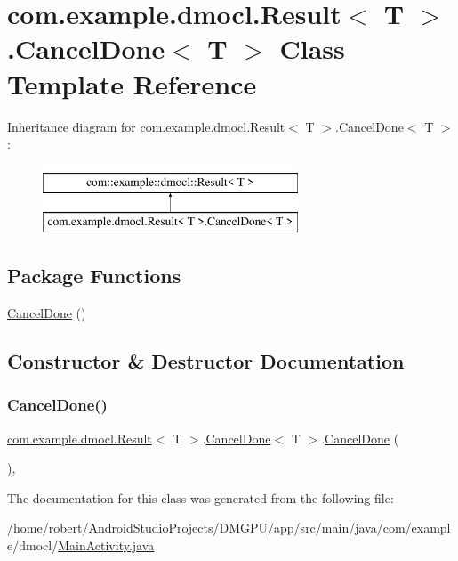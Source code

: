 \hypertarget{classcom_1_1example_1_1dmocl_1_1Result_1_1CancelDone}{}\section{com.\+example.\+dmocl.\+Result$<$ T $>$.Cancel\+Done$<$ T $>$ Class Template Reference}
\label{classcom_1_1example_1_1dmocl_1_1Result_1_1CancelDone}
Inheritance diagram for com.\+example.\+dmocl.\+Result$<$ T $>$.Cancel\+Done$<$ T $>$\+:\begin{figure}[H]
\begin{center}
\leavevmode
\includegraphics[height=2.000000cm]{classcom_1_1example_1_1dmocl_1_1Result_1_1CancelDone}
\end{center}
\end{figure}
\subsection*{Package Functions}
\begin{DoxyCompactItemize}
\item 
\mbox{\hyperlink{classcom_1_1example_1_1dmocl_1_1Result_1_1CancelDone_a11314afeb254ce8d50900ba88538f988}{Cancel\+Done}} ()
\end{DoxyCompactItemize}


\subsection{Constructor \& Destructor Documentation}
\mbox{\label{classcom_1_1example_1_1dmocl_1_1Result_1_1CancelDone_a11314afeb254ce8d50900ba88538f988}} 
\subsubsection{\texorpdfstring{Cancel\+Done()}{CancelDone()}}
{\footnotesize\ttfamily \mbox{\hyperlink{classcom_1_1example_1_1dmocl_1_1Result}{com.\+example.\+dmocl.\+Result}}$<$ T $>$.\mbox{\hyperlink{classcom_1_1example_1_1dmocl_1_1Result_1_1CancelDone}{Cancel\+Done}}$<$ T $>$.\mbox{\hyperlink{classcom_1_1example_1_1dmocl_1_1Result_1_1CancelDone}{Cancel\+Done}} (\begin{DoxyParamCaption}{ }\end{DoxyParamCaption})\hspace{0.3cm}{\ttfamily [inline]}, {\ttfamily [package]}}



The documentation for this class was generated from the following file\+:\begin{DoxyCompactItemize}
\item 
/home/robert/\+Android\+Studio\+Projects/\+D\+M\+G\+P\+U/app/src/main/java/com/example/dmocl/\mbox{\hyperlink{MainActivity_8java}{Main\+Activity.\+java}}\end{DoxyCompactItemize}
